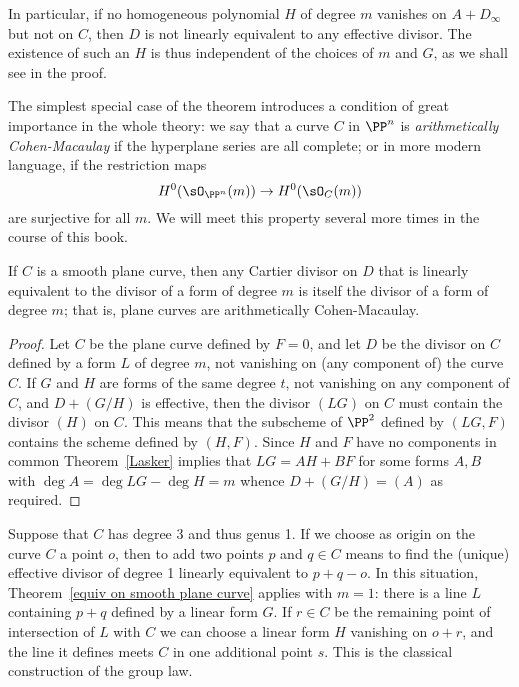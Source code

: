 In particular, if no homogeneous polynomial $H$ of degree $m$ vanishes on  $A + D_\infty$ but not on $C$, then $D$ is not linearly equivalent to any effective divisor. The existence of such an $H$ is thus independent of the choices of $m$ and $G$, as we shall see in the proof.

The simplest special case of the theorem introduces a condition of great importance in the whole theory: we say that a curve $C$ in $\PP^{n}$ is \emph{arithmetically Cohen-Macaulay} if the hyperplane series
are all complete; or in more modern language, if the restriction maps
$$
H^{0}(\sO_{\PP^{n}}(m)) \to H^{0}(\sO_{C}(m))
$$
are surjective for all $m$. We will meet this property several more times in the course of this book.

\begin{proposition}\label {completeness of hyperplanes on plane curve}
If $C$ is a smooth plane curve, then any Cartier divisor on $D$ that is linearly equivalent to the divisor of
a form of degree $m$ is itself the divisor of a form of degree $m$; that is, plane curves are
arithmetically Cohen-Macaulay.
\end{proposition}

\begin{proof}
Let $C$ be the plane curve defined by $F=0$, and let $D$ be the divisor on $C$ defined by a form $L$
of degree $m$, not vanishing on (any component of) the curve $C$. If $G$ and $H$ are forms of the same degree $t$, 
not vanishing on any component of $C$,
and $D+(G/H)$ is effective, then the divisor $(LG)$  on $C$ must contain the divisor $(H)$ on $C$.
This means that the subscheme of $\PP^{2}$ defined by $(LG,F)$ contains the scheme defined 
by $(H,F)$. Since $H$ and $F$ have no components in common Theorem~\ref{Lasker} implies
that $LG = AH+BF$  for some forms $A,B$ with $\deg A = \deg LG -\deg H = m$ whence $D+(G/H) = (A)$
as required.
\end{proof}

\begin{example}
Suppose that $C$ has degree 3 and thus genus 1. If we choose as origin on the curve $C$ a point $o$, then to add two points $p$ and $q \in C$ means to find the (unique) effective divisor of degree 1 linearly equivalent to $p + q - o$. In this situation, Theorem~\ref{equiv on smooth plane curve} applies with $m=1$: there is a line $L$ 
containing $p+q$ defined by a linear form $G$. If $r \in C$ be the remaining point of intersection of $L$ with $C$ we can choose a linear form $H$ vanishing on $o+r$, and the line it defines meets $C$
in one additional point $s$. This is the classical construction of the group law.
\end{example}

